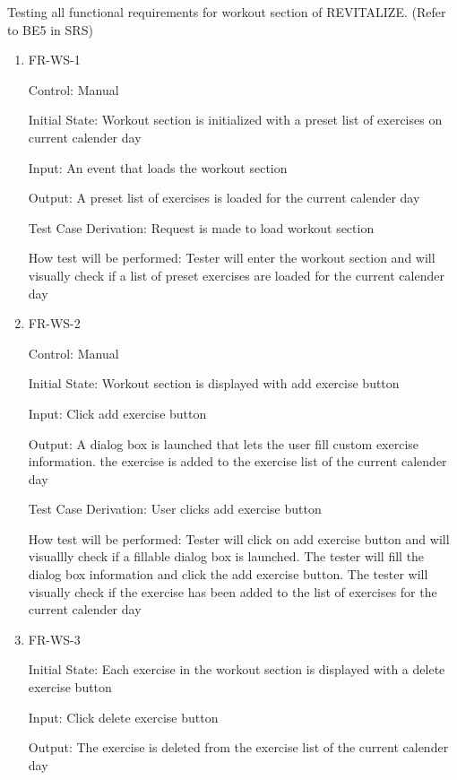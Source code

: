 \documentclass[12pt, titlepage]{article}
\begin{document}
Testing all functional requirements for workout section of REVITALIZE. (Refer to BE5 in SRS)

\begin{enumerate}

\item{FR-WS-1\\}

Control: Manual
					
Initial State: Workout section is initialized with a preset list of exercises on current calender day
					
Input: An event that loads the workout section
					
Output: A preset list of exercises is loaded for the current calender day

Test Case Derivation: Request is made to load workout section

How test will be performed: Tester will enter the workout section and will visually check if a list of preset exercises are loaded for the current calender day
					
\item{FR-WS-2 \\}

Control: Manual
					
Initial State: Workout section is displayed with add exercise button
					
Input: Click add exercise button
					
Output: A dialog box is launched that lets the user fill custom exercise information. the exercise is added to the exercise list of the current calender day

Test Case Derivation: User clicks add exercise button

How test will be performed: Tester will click on add exercise button and will visuallly check if a fillable dialog box is launched. The tester will fill the dialog box information and click the add exercise button. The tester will visually check if the exercise has been added to the list of exercises for the current calender day

\item{FR-WS-3\\}

Initial State: Each exercise in the workout section is displayed with a delete exercise button
					
Input: Click delete exercise button
					
Output: The exercise is deleted from the exercise list of the current calender day


\end{enumerate}
\end{document}
